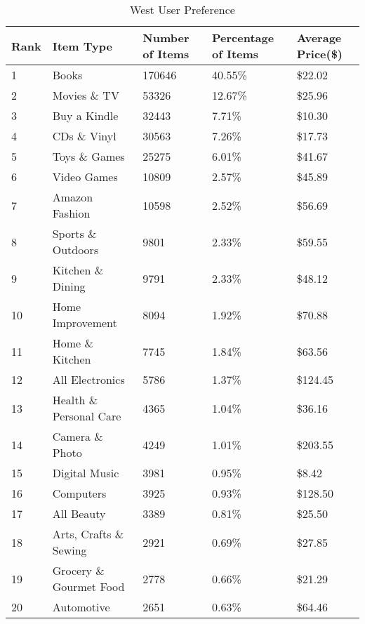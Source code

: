 \begin{table}[!ht]
\centering
\caption{West User Preference}
\begin{adjustbox}{max width=.5\textwidth}
\begin{tabular}{lllll}
Rank & Item Type          & Number of Items & Percentage of Items & Average Price(\$) \\ \hline
1 & Books & 170646 & 40.55\% & \$22.02 \\
2 & Movies \& TV & 53326 & 12.67\% & \$25.96 \\
3 & Buy a Kindle & 32443 & 7.71\% & \$10.30 \\
4 & CDs \& Vinyl & 30563 & 7.26\% & \$17.73 \\
5 & Toys \& Games & 25275 & 6.01\% & \$41.67 \\
6 & Video Games & 10809 & 2.57\% & \$45.89 \\
7 & Amazon Fashion & 10598 & 2.52\% & \$56.69 \\
8 & Sports \& Outdoors & 9801 & 2.33\% & \$59.55 \\
9 & Kitchen \& Dining & 9791 & 2.33\% & \$48.12 \\
10 & Home Improvement & 8094 & 1.92\% & \$70.88 \\
11 & Home \& Kitchen & 7745 & 1.84\% & \$63.56 \\
12 & All Electronics & 5786 & 1.37\% & \$124.45 \\
13 & Health \& Personal Care & 4365 & 1.04\% & \$36.16 \\
14 & Camera \& Photo & 4249 & 1.01\% & \$203.55 \\
15 & Digital Music & 3981 & 0.95\% & \$8.42 \\
16 & Computers & 3925 & 0.93\% & \$128.50 \\
17 & All Beauty & 3389 & 0.81\% & \$25.50 \\
18 & Arts, Crafts \& Sewing & 2921 & 0.69\% & \$27.85 \\
19 & Grocery \& Gourmet Food & 2778 & 0.66\% & \$21.29 \\
20 & Automotive & 2651 & 0.63\% & \$64.46 \\
\end{tabular}
\end{adjustbox}
\end{table}

